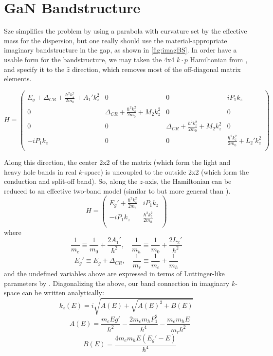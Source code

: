 \section{GaN Bandstructure}
Sze simplifies the problem by using a parabola with curvature set by the effective mass for the dispersion, but one really should use the material-appropriate imaginary bandstructure in the gap, as shown in \ref{fig:imagBS}.  In order have a usable form for the bandstructure, we may taken the 4x4 $k\cdot p$ Hamiltonian from \cite{Rinke_2008}, and specify it to the $\hat{z}$ direction, which removes most of the off-diagonal matrix elements.
\usepackage{lipsum}
\begin{widetext}
\[
  H=\begin{pmatrix}
    E_g+\Delta_{CR}+\frac{\hbar^2k_z^2}{2m_0}+A_1'k_z^2 & 0 & 0 &iP_1k_z\\
    0 &  \Delta_{CR}+\frac{\hbar^2k_z^2}{2m_0}+M_2k_z^2 & 0 & 0 \\
    0 & 0 & \Delta_{CR}+\frac{\hbar^2k_z^2}{2m_0}+M_2k_z^2 & 0 \\
    -iP_1k_z & 0 & 0 & \frac{\hbar^2k_z^2}{2m_0}+L_2'k_z^2  \\
  \end{pmatrix}
\]
\end{widetext}
Along this direction, the center 2x2 of the matrix (which form the light and heavy hole bands in real $k$-space) is uncoupled to the outside 2x2 (which form the conduction and split-off band).  So, along the $z$-axis, the Hamiltonian can be reduced to an effective two-band model (similar to but more general than \cite{Kane_1960}).
\[
  H=\begin{pmatrix}
    E_g'+\frac{\hbar^2k_z^2}{2m_e} & iP_1k_z\\
    -iP_1k_z & \frac{\hbar^2k_z^2}{2m_h} \\
  \end{pmatrix}
\]
where
\[\frac{1}{m_e}\equiv\frac{1}{m_0}+\frac{2A_1'}{\hbar^2},
\quad \frac{1}{m_h}\equiv\frac{1}{m_0}+\frac{2L_2'}{\hbar^2}
\]
\[
  E_g'\equiv E_g+\Delta_{CR}, \quad
\frac{1}{m_r}\equiv\frac{1}{m_e}+\frac{1}{m_h}
\]
and the undefined variables above are expressed in terms of Luttinger-like parameters by \cite{Rinke_2008}.  Diagonalizing the above, our band connection in imaginary $k$-space can be written analytically:
$$k_z(E)=i\sqrt{A(E)+\sqrt{A(E)^2+B(E)}}$$
$$\quad A(E)=\frac{m_eEg'}{\hbar^2}-\frac{2m_em_hP_1^2}{\hbar^4}-\frac{m_em_hE}{m_r\hbar^2}$$
$$\quad B(E)=\frac{4m_em_hE(E_g'-E)}{\hbar^4}$$

